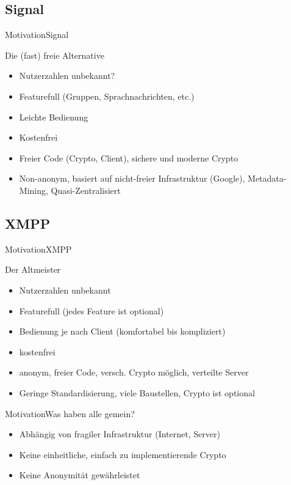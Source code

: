 \subsection{Signal}
\begin{frame}{Motivation}{Signal}
	\begin{block}{Die (fast) freie Alternative}
		\begin{itemize}[<+->]
		\item \color{green} Nutzerzahlen unbekannt?
		\item Featurefull (Gruppen, Sprachnachrichten, etc.)
		\item Leichte Bedienung
		\item Kostenfrei
		\item \color{green} Freier Code (Crypto, Client), sichere und moderne Crypto
		\item \color{red} Non-anonym, basiert auf nicht-freier Infrastruktur (Google), Metadata-Mining, Quasi-Zentralisiert
		\end{itemize}
	\end{block}
\end{frame}

\subsection{XMPP}
\begin{frame}{Motivation}{XMPP}
	\begin{block}{Der Altmeister}
		\begin{itemize}[<+->]
		\item \color{green} Nutzerzahlen unbekannt
		\item Featurefull (jedes Feature ist optional)
		\item Bedienung je nach Client (komfortabel bis kompliziert)
		\item kostenfrei
		\item \color{green} anonym, freier Code, versch. Crypto möglich, verteilte Server
		\item \color{red} Geringe Standardisierung, viele Baustellen, Crypto ist optional
		\end{itemize}
	\end{block}
\end{frame}

\begin{frame}{Motivation}{Was haben alle gemein?}
	\begin{itemize}
	\item Abhängig von fragiler Infrastruktur (Internet, Server)
	\item Keine einheitliche, einfach zu implementierende Crypto
	\item Keine Anonymität gewährleistet
	\end{itemize}
\end{frame}